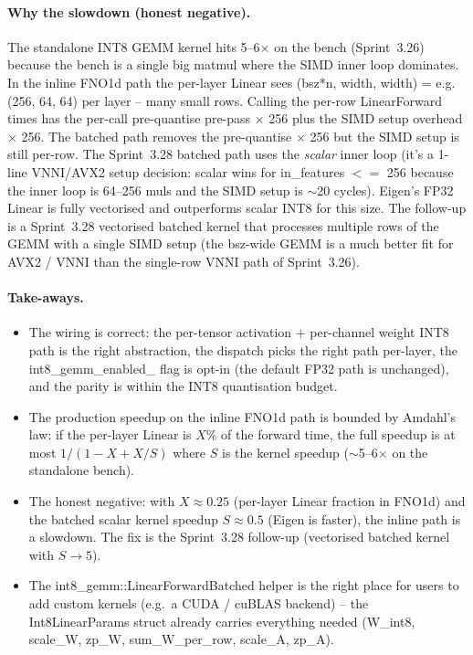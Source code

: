 \documentclass[10pt,twocolumn]{article}
\renewcommand{\texttt}[1]{{\normalfont\ttfamily #1}\normalfont\rmfamily}
\begin{document}
\paragraph{Why the slowdown (honest
negative).}
The standalone INT8 GEMM kernel hits
5--6$\times$ on the bench (Sprint~3.26)
because the bench is a single big
matmul where the SIMD inner loop
dominates.  In the inline FNO1d path
the per-layer Linear sees
\texttt{(bsz*n, width, width)} = e.g.
\texttt{(256, 64, 64)} per layer --
many small rows.  Calling the per-row
\texttt{LinearForward} 256 times has
the per-call pre-quantise pre-pass
$\times$ 256 plus the SIMD setup
overhead $\times$ 256.  The batched
path removes the pre-quantise
$\times$ 256 but the SIMD setup is
still per-row.  The Sprint~3.28 batched
path uses the \emph{scalar} inner loop
(it's a 1-line VNNI/AVX2 setup
decision: scalar wins for
\texttt{in\_features} $<=$ 256 because
the inner loop is 64--256 muls and the
SIMD setup is $\sim$20 cycles).  Eigen's
FP32 Linear is fully vectorised and
outperforms scalar INT8 for this size.
The follow-up is a Sprint~3.28
vectorised batched kernel that processes
multiple rows of the GEMM with a
single SIMD setup (the
\texttt{bsz}-wide GEMM is a much
better fit for AVX2 / VNNI than the
single-row VNNI path of Sprint~3.26).

\paragraph{Take-aways.}
\begin{itemize}
\item The wiring is correct: the
  per-tensor activation + per-channel
  weight INT8 path is the right
  abstraction, the dispatch picks the
  right path per-layer, the
  \texttt{int8\_gemm\_enabled\_} flag
  is opt-in (the default FP32 path
  is unchanged), and the parity is
  within the INT8 quantisation budget.
\item The production speedup on the
  inline FNO1d path is bounded by
  Amdahl's law: if the per-layer
  Linear is $X$\% of the forward
  time, the full speedup is at most
  $1 / (1-X+X/S)$ where $S$ is the
  kernel speedup ($\sim$5--6$\times$
  on the standalone bench).
\item The honest negative: with
  $X \approx 0.25$ (per-layer Linear
  fraction in FNO1d) and the batched
  scalar kernel speedup
  $S \approx 0.5$ (Eigen is faster),
  the inline path is a slowdown.  The
  fix is the Sprint~3.28 follow-up
  (vectorised batched kernel with
  $S \to 5$).
\item The
  \texttt{int8\_gemm::LinearForwardBatched}
  helper is the right place for users
  to add custom kernels (e.g.\ a
  CUDA / cuBLAS backend) -- the
  \texttt{Int8LinearParams} struct
  already carries everything needed
  (W\_int8, scale\_W, zp\_W,
  sum\_W\_per\_row, scale\_A, zp\_A).
\end{itemize}
\end{document}
